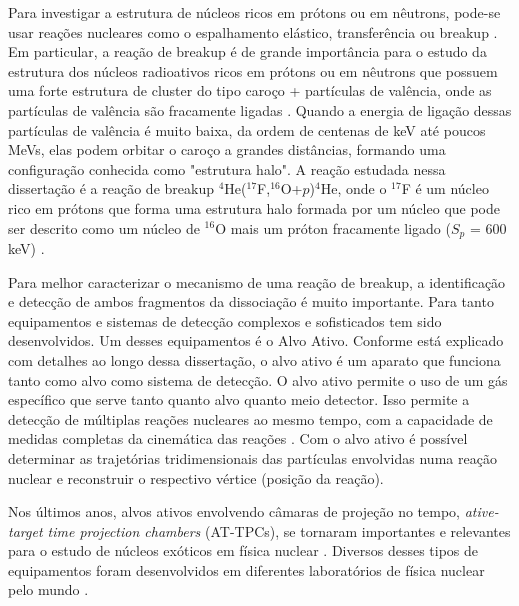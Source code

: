 \documentclass[a4paper,12pt,oneside]{book}
\begin{document}
\par Para investigar a estrutura de núcleos ricos em prótons ou em nêutrons, pode-se usar reações nucleares como o espalhamento elástico, transferência ou breakup \cite{Kolata2016}. Em particular, a reação de breakup é de grande importância para o estudo da estrutura dos núcleos radioativos ricos em prótons ou em nêutrons que possuem uma forte estrutura de cluster do tipo caroço + partículas de valência, onde as partículas de valência são fracamente ligadas \cite{Kolata2016, MORO_BREAKUP}. Quando a energia de ligação dessas partículas de valência é muito baixa, da ordem de centenas de keV até poucos MeVs, elas podem orbitar o caroço a grandes distâncias, formando uma configuração conhecida como "estrutura halo". A reação estudada nessa dissertação é a reação de breakup $^4$He($^{17}$F,$^{16}$O+$p$)$^4$He, onde o $^{17}$F é um núcleo rico em prótons que forma uma estrutura halo formada por um núcleo que pode ser descrito como um núcleo de $^{16}$O mais um próton fracamente ligado ($S_p$ = 600 keV) \cite{MORO_BREAKUP}.

\par Para melhor caracterizar o mecanismo de uma reação de breakup, a identificação e detecção de ambos fragmentos da dissociação é muito importante. Para tanto equipamentos e sistemas de detecção complexos e sofisticados tem sido desenvolvidos. Um desses equipamentos é o Alvo Ativo. Conforme está explicado com detalhes ao longo dessa dissertação, o alvo ativo é um aparato que funciona tanto como alvo como sistema de detecção. O alvo ativo permite o uso de um gás específico que serve tanto quanto alvo quanto meio detector. Isso permite a detecção de múltiplas reações nucleares ao mesmo tempo, com a capacidade de medidas completas da cinemática das reações \cite{FORTINO2022166497, josh_bradt, attpc}. Com o alvo ativo é possível determinar as trajetórias tridimensionais das partículas envolvidas numa reação nuclear e reconstruir o respectivo vértice (posição da reação).





\par Nos últimos anos, alvos ativos envolvendo câmaras de projeção no tempo, \textit{ative-target time projection chambers} (AT-TPCs), se tornaram importantes e relevantes para o estudo de núcleos exóticos em física nuclear \cite{FORTINO2022166497}. Diversos desses tipos de equipamentos foram desenvolvidos em diferentes laboratórios de física nuclear pelo mundo \cite{attpc, FURUNO2018215, KOSHCHIY2020163398}.
\end{document}
